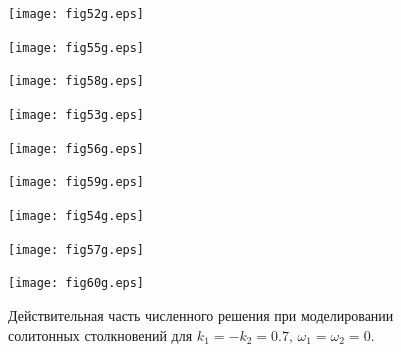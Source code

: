 \documentclass[14pt,a4paper]{extreport}
\begin{document}
			\begin{figure}[H]
				\begin{minipage}[h]{0.32\linewidth}
					\texttt{[image: fig52g.eps]}
				\end{minipage}
				\begin{minipage}[h]{0.32\linewidth}
					\texttt{[image: fig55g.eps]}
				\end{minipage}
				\begin{minipage}[h]{0.32\linewidth}
					\texttt{[image: fig58g.eps]}
				\end{minipage}

				\begin{minipage}[h]{0.32\linewidth}
					\texttt{[image: fig53g.eps]}
				\end{minipage}
				\begin{minipage}[h]{0.32\linewidth}
					\texttt{[image: fig56g.eps]}
				\end{minipage}
				\begin{minipage}[h]{0.32\linewidth}
					\texttt{[image: fig59g.eps]}
				\end{minipage}

				\begin{minipage}[h]{0.32\linewidth}
					\texttt{[image: fig54g.eps]}
				\end{minipage}
				\begin{minipage}[h]{0.32\linewidth}
					\texttt{[image: fig57g.eps]}
				\end{minipage}
				\begin{minipage}[h]{0.32\linewidth}
					\texttt{[image: fig60g.eps]}
				\end{minipage}
				\caption{Действительная часть численного решения при моделировании солитонных столкновений для \(k_{1}=-k_{2}=0.7,\,\omega_{1}=\omega_{2}=0\).}
				\label{fig51}
			\end{figure}
\end{document}
